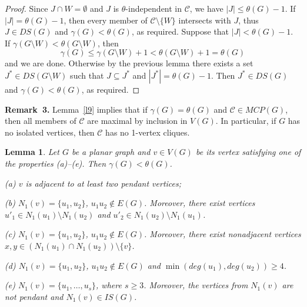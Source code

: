 \documentclass[12pt]{article}
\newtheorem{lemma}{Lemma}
\begin{document}
\begin{proof}
Since $J \cap W = \emptyset$ and $J$ is $\theta$-independent in $\mathcal{C}$, we have $|J| \leq \theta(G) - 1$. If $|J| = \theta(G) - 1$, then every member of $\mathcal{C} \setminus \{W\}$ intersects with $J$, thus $J \in DS(G)$ and $\gamma(G) < \theta(G)$, as required. Suppose that $|J| < \theta(G) - 1$. If $\gamma(G \setminus W) < \theta(G \setminus W)$, then $$\gamma(G) \leq \gamma(G \setminus W) + 1 < \theta(G \setminus W) + 1 = \theta(G)$$ and we are done. Otherwise by the previous lemma there exists a set $J^* \in DS(G \setminus W)$ such that $J \subseteq J^*$ and $|J^*| = \theta(G) - 1$. Then $J^* \in DS(G)$ and $\gamma(G) < \theta(G)$, as required.
\end{proof}

\textbf{Remark~3.} Lemma~\ref{l9} implies that if $\gamma(G) = \theta(G)$ and $\mathcal{C} \in MCP(G)$, then all members of $\mathcal{C}$ are maximal by inclusion in $V(G)$. In particular, if $G$ has no isolated vertices, then $\mathcal{C}$ has no 1-vertex cliques.

\begin{lemma}\label{l10}
Let $G$ be a planar graph and $v \in V(G)$ be its vertex satisfying one of the properties (a)--(e). Then $\gamma(G) < \theta(G)$.

(a) $v$ is adjacent to at least two pendant vertices;

(b) $N_1(v) = \{u_1,u_2\}$, $u_1u_2 \notin E(G)$. Moreover, there exist vertices $u'_1 \in N_1(u_1) \setminus N_1(u_2)$ and $u'_2 \in N_1(u_2) \setminus N_1(u_1)$.

(c) $N_1(v) = \{u_1,u_2\}$, $u_1u_2 \notin E(G)$. Moreover, there exist nonadjacent vertices $x,y \in (N_1(u_1) \cap N_1(u_2)) \setminus \{v\}$.

(d) $N_1(v) = \{u_1,u_2\}$, $u_1u_2 \notin E(G)$ and $\min(deg(u_1),deg(u_2)) \geq 4$.

(e) $N_1(v) = \{u_1,\ldots,u_s\}$, where $s \geq 3$. Moreover, the vertices from $N_1(v)$ are not pendant and $N_1(v) \in IS(G)$.
\end{lemma}
\end{document}
